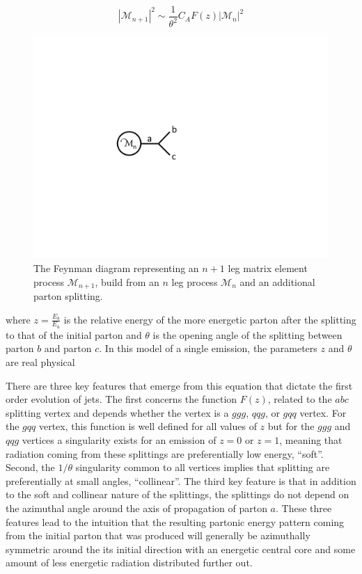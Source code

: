 \documentclass[UKenglish,texlive=2016]{\ATLASLATEXPATH atlasdoc}
\begin{document}
\begin{equation}
|\mathcal{M}_{n+1}|^2 \sim \frac{1}{\theta^{2}} C_{A} F(z) |\mathcal{M}_{n}|^2
\end{equation}

\begin{figure}[!ht]
 \centering
 \includegraphics[width=0.3\columnwidth]{figures/diagram}
 \caption{The Feynman diagram representing an $n+1$ leg matrix element process $\mathcal{M}_{n+1}$, build from an $n$ leg process $\mathcal{M}_{n}$ and an additional parton splitting.
 \label{fig:diagrams}}
\end{figure}

\noindent
where $z=\frac{E_{b}}{E_{a}}$ is the relative energy of the more energetic parton after the splitting to that of the initial parton and $\theta$ is the opening angle of the splitting between parton $b$ and parton $c$.  In this model of a single emission, the parameters $z$ and $\theta$ are real physical


There are three key features that emerge from this equation that dictate the first order evolution of jets.  The first concerns the function $F(z)$, related to the $abc$ splitting vertex and depends whether the vertex is a $ggg$, $qqg$, or $gqq$ vertex.  For the $gqq$ vertex, this function is well defined for all values of $z$ but for the $ggg$ and $qqg$ vertices a singularity exists for an emission of $z=0$ or $z=1$, meaning that radiation coming from these splittings are preferentially low energy, ``soft''.  Second, the $1/\theta$ singularity common to all vertices implies that splitting are preferentially at small angles, ``collinear''.  The third key feature is that in addition to the soft and collinear nature of the splittings, the splittings do not depend on the azimuthal angle around the axis of propagation of parton $a$.  These three features lead to the intuition that the resulting partonic energy pattern coming from the initial parton that was produced will generally be azimuthally symmetric around the its initial direction with an energetic central core and some amount of less energetic radiation distributed further out.
\end{document}
